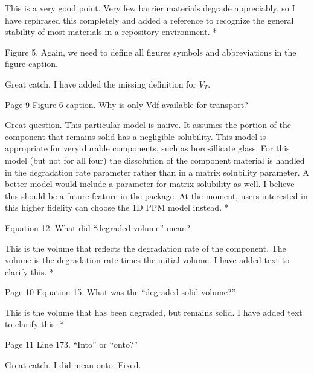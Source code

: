 \documentclass[answers,12pt]{exam}
\begin{document}
\begin{questions}
\begin{solution}
This is a very good point. Very few barrier materials degrade appreciably, so I 
have rephrased this completely and added a reference to recognize the general 
stability of most materials in a repository environment. 
        {\color{red}*}
\end{solution}

\question Figure 5. Again, we need to define all figures symbols and abbreviations in the figure caption.
\begin{solution}
Great catch. I have added the missing definition for $V_T$. 
\end{solution}

\question Page 9 Figure 6 caption. Why is only Vdf available for transport?
\begin{solution}
Great question. This particular model is naiive. It assumes the portion of the 
        component that remains solid  has a negligible solubility. This model 
        is appropriate for very durable components, such as borosillicate 
        glass.  For this model (but not for all four) the dissolution of the 
        component material is handled in the degradation rate parameter rather 
        than in a matrix solubility parameter. A better model would include a 
        parameter for matrix solubility as well. I believe this should be a 
        future feature in the package. At the moment, users interested in this 
        higher fidelity can choose the 1D PPM model instead. 
        {\color{red}*}
\end{solution}

\question Equation 12. What did “degraded volume” mean?
\begin{solution}
This is the volume that reflects the degradation rate of the component. The 
        volume is the degradation rate times the initial volume. I have added 
        text to clarify this.
        {\color{red}*}
\end{solution}

\question Page 10 Equation 15. What was the “degraded solid volume?”
\begin{solution}
        This is the volume that has been degraded, but remains solid. I have 
        added text to clarify this. 
        {\color{red}*}
\end{solution}
 

\question Page 11 Line 173. “Into” or “onto?”
\begin{solution}
Great catch. I did mean onto. Fixed.
\end{solution}


\end{questions}
\end{document}
